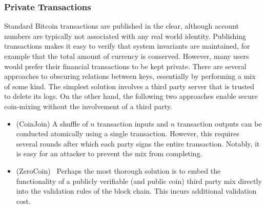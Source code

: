 \begin{itemize}
\end{itemize}

\subsubsection{Private Transactions}
Standard Bitcoin transactions are published in the clear, although account numbers are typically not associated with any real world identity. Publishing transactions makes it easy to verify that system invariants are maintained, for example that the total amount of currency is conserved. However, many users would prefer their financial transactions to be kept private. There are several approaches to obscuring relations between keys, essentially by performing a mix of some kind. The simplest solution involves a third party server that is trusted to delete its logs. On the other hand, the following two approaches enable secure coin-mixing without the involvement of a third party.

\begin{itemize}
\item (CoinJoin) A shuffle of $n$ transaction inputs and $n$ transaction outputs can be conducted atomically using a single transaction. However, this requires several rounds after which each party signs the entire transaction. Notably, it is easy for an attacker to prevent the mix from completing.
\item (ZeroCoin)~\cite{miers2013zerocoin} Perhaps the most thorough solution is to embed the functionality of a publicly verifiable (and public coin) third party mix directly into the validation rules of the block chain. This incurs additional validation cost.
\end{itemize}

